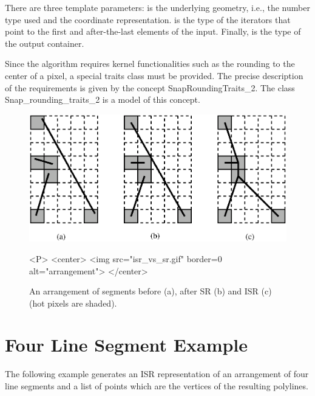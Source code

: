 There are three template parameters:  is the underlying geometry, i.e., the number type used
and the coordinate representation.  is the type of the iterators that point to the first
and after-the-last elements of the input. Finally,  is the type of the output container.

Since the algorithm requires kernel functionalities such as the rounding to the center of a pixel, a special
traits class must be provided. The precise description of the requirements is given by the
concept SnapRoundingTraits\_2. The class Snap\_rounding\_traits\_2 is a model of this concept.

\begin{figure}
\begin{ccTexOnly}
\centerline{\includegraphics{Snap_rounding_2/isr_vs_sr.ps}}
\end{ccTexOnly}

\caption{An arrangement of segments before (a), after SR (b)
and ISR (c) (hot pixels are shaded).}
\label{fig:isr_vs_sr}

\begin{ccHtmlOnly}
<P>
<center>
  <img src="isr_vs_sr.gif"  border=0 alt="arrangement">
</center>
\end{ccHtmlOnly}
\end{figure}


\section{Four Line Segment Example}

The following example generates an ISR representation
of an arrangement of four line segments
and a list of points which are the vertices of the resulting polylines.


